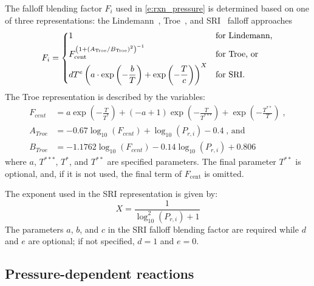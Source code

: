 \documentclass[12pt,number,sort&compress]{elsarticle}
\begin{document}
The falloff blending factor $F_i$ used in \cref{e:rxn_pressure} is determined based on one of three representations: the Lindemann~\cite{Lindemann:1922cz}, Troe~\cite{Gilbert:1983bb}, and SRI~\cite{Stewart:1989gj} falloff approaches
\begin{equation}
\label{e:fi}
F_i = \begin{dcases}
1 &\text{for Lindemann,} \\
F_{\text{cent}}^{ \left( 1 + ( A_{\text{Troe}} / B_{\text{Troe}} )^2 \right)^{-1} } &\text{for Troe, or} \\
d T^e \left( a \cdot \exp \left( -\frac{b}{T} \right) + \exp \left( -\frac{T}{c} \right) \right)^X &\text{for SRI.}
\end{dcases}
\end{equation}
The Troe representation is described by the variables:
\begin{align}
 F_{cent} &= a \operatorname{exp}\left({- \frac{T}{T^{*}}}\right) + \left(- a + 1\right) \operatorname{exp}\left({- \frac{T}{T^{***}}}\right) + \operatorname{exp}\left({- \frac{T^{**}}{T}}\right) \;, \\
 A_{Troe} &= - 0.67 \log_{10}{\left (F_{cent} \right )} + \log_{10}{\left (P_{r, i} \right )} - 0.4 \;\text{, and}\\
 B_{Troe} &= - 1.1762 \log_{10}{\left (F_{cent} \right )} - 0.14 \log_{10}{\left (P_{r, i} \right )} + 0.806
\end{align}
where $a$, $T^{***}$, $T^*$, and $T^{**}$ are specified parameters.
The final parameter $T^{**}$ is optional, and, if it is not used, the final term of $F_{\text{cent}}$ is omitted.

The exponent used in the SRI representation is given by:
\begin{equation}
 X = \frac{1}{\log_{10}^{2}{\left (P_{r, i} \right )} + 1}
\end{equation}
The parameters $a$, $b$, and $c$ in the SRI falloff blending factor are required while $d$ and $e$ are optional; if not specified, $d = 1$ and $e = 0$.

\subsection{Pressure-dependent reactions}
\label{s:pdep}
\end{document}
